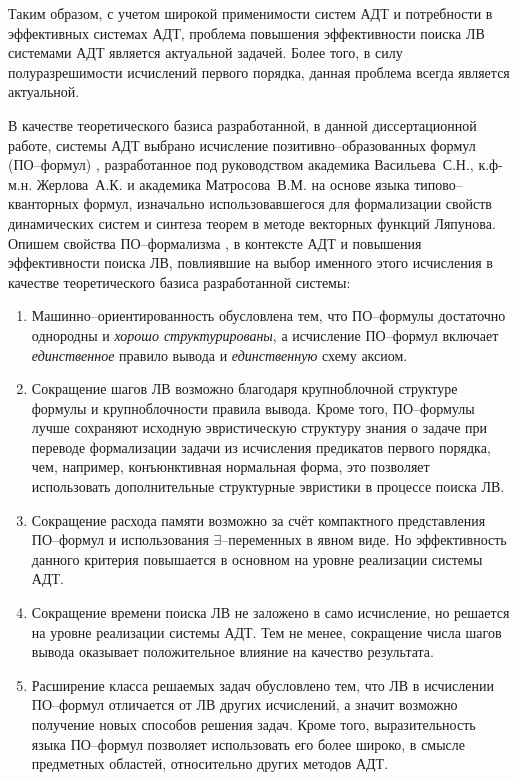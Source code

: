 Таким образом, с учетом широкой применимости систем АДТ и потребности в эффективных системах АДТ, проблема повышения эффективности поиска ЛВ системами АДТ является актуальной задачей. Более того, в силу полуразрешимости исчислений первого порядка, данная проблема всегда является актуальной.

В качестве теоретического базиса разработанной, в данной диссертационной работе, системы АДТ выбрано исчисление позитивно--образованных формул (ПО--формул) \cite{ICDS2000, Vas1995}, разработанное под руководством академика Васильева~С.Н., к.ф-м.н. Жерлова~А.К. и академика Матросова~В.М. на основе языка типово--кванторных формул, изначально использовавшегося для формализации свойств динамических систем и синтеза теорем в методе векторных функций Ляпунова. Опишем свойства ПО--формализма \cite{ICDS2000}, в контексте АДТ и повышения эффективности поиска ЛВ, повлиявшие на выбор именного этого исчисления в качестве теоретического базиса разработанной системы:
\begin{enumerate}
\item {Машинно--ориентированность} обусловлена тем, что ПО--формулы достаточно однородны и \emph{хорошо структурированы}, а исчисление ПО--формул включает \emph{единственное} правило вывода и \emph{единственную} схему аксиом.
\item {Сокращение шагов ЛВ} возможно благодаря крупноблочной структуре формулы и крупноблочности правила вывода. Кроме того, ПО--формулы лучше сохраняют исходную эвристическую структуру знания о задаче при переводе формализации задачи из исчисления предикатов первого порядка, чем, например, конъюнктивная нормальная форма, это позволяет использовать дополнительные структурные эвристики в процессе поиска ЛВ. 
\item {Сокращение расхода памяти} возможно за счёт компактного представления ПО--формул и использования $\exists$--переменных в явном виде. Но эффективность данного критерия повышается в основном на уровне реализации системы АДТ.
\item {Сокращение времени поиска ЛВ} не заложено в само исчисление, но решается на уровне реализации системы АДТ. Тем не менее, сокращение числа шагов вывода оказывает положительное влияние на качество результата.
\item {Расширение класса решаемых задач} обусловлено тем, что ЛВ в исчислении ПО--формул отличается от ЛВ других исчислений, а значит возможно получение новых способов решения задач. Кроме того, выразительность языка ПО--формул позволяет использовать его более широко, в смысле предметных областей, относительно других методов АДТ. 
\end{enumerate}

